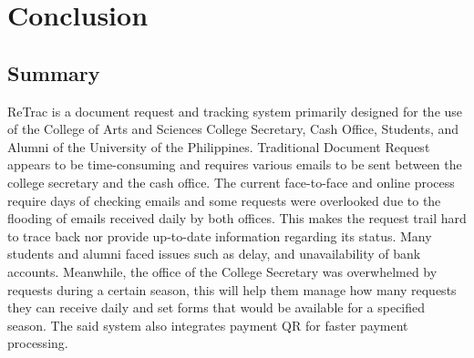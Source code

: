 \chapter{Conclusion}

\section{Summary}
ReTrac is a document request and tracking system primarily designed for the use of the College of Arts and Sciences College Secretary, Cash Office, Students, and Alumni of the University of the Philippines. Traditional Document Request appears to be time-consuming and requires various emails to be sent between the college secretary and the cash office. The current face-to-face and online process require days of checking emails and some requests were overlooked due to the flooding of emails received daily by both offices. This makes the request trail hard to trace back nor provide up-to-date information regarding its status. Many students and alumni faced issues such as delay, and unavailability of bank accounts. Meanwhile, the office of the College Secretary was overwhelmed by requests during a certain season, this will help them manage how many requests they can receive daily and set forms that would be available for a specified season. The said system also integrates payment QR for faster payment processing. 


